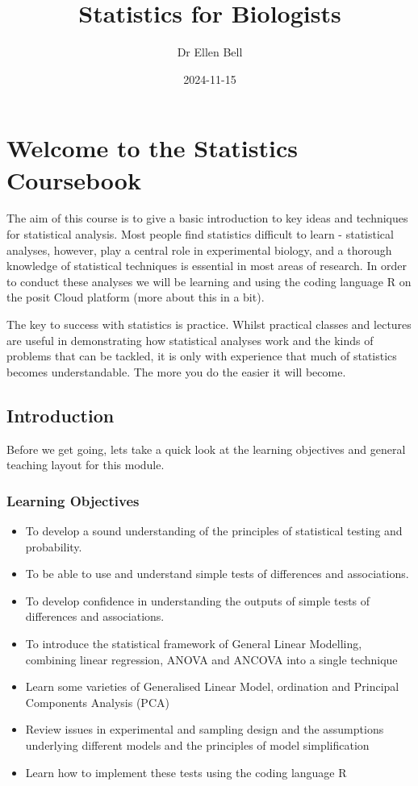 \documentclass[
]{book}
\title{Statistics for Biologists}
\author{Dr Ellen Bell}
\date{2024-11-15}
\providecommand{\tightlist}{%
  \setlength{\itemsep}{0pt}\setlength{\parskip}{0pt}}
\begin{document}
\maketitle

{
\setcounter{tocdepth}{1}
\tableofcontents
}
\chapter{Welcome to the Statistics Coursebook}\label{c1}

The aim of this course is to give a basic introduction to key ideas and techniques for statistical analysis. Most people find statistics difficult to learn - statistical analyses, however, play a central role in experimental biology, and a thorough knowledge of statistical techniques is essential in most areas of research. In order to conduct these analyses we will be learning and using the coding language R on the posit Cloud platform (more about this in a bit).

The key to success with statistics is practice. Whilst practical classes and lectures are useful in demonstrating how statistical analyses work and the kinds of problems that can be tackled, it is only with experience that much of statistics becomes understandable. The more you do the easier it will become.

\section{Introduction}\label{introduction}

Before we get going, lets take a quick look at the learning objectives and general teaching layout for this module.

\subsection{Learning Objectives}\label{learning-objectives}

\begin{itemize}
\tightlist
\item
  To develop a sound understanding of the principles of statistical testing and probability.
\item
  To be able to use and understand simple tests of differences and associations.
\item
  To develop confidence in understanding the outputs of simple tests of differences and associations.
\item
  To introduce the statistical framework of General Linear Modelling, combining linear regression, ANOVA and ANCOVA into a single technique
\item
  Learn some varieties of Generalised Linear Model, ordination and Principal Components Analysis (PCA)
\item
  Review issues in experimental and sampling design and the assumptions underlying different models and the principles of model simplification
\item
  Learn how to implement these tests using the coding language R
\end{itemize}
\end{document}
